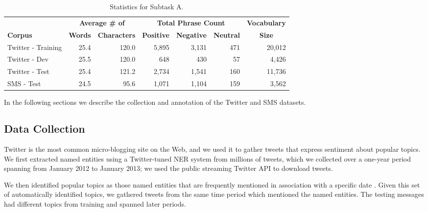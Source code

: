 
 \begin{table}[t]
\small
\begin{center}
\begin{tabular}{|l|r|r|r|r|r|r|}
\hline
 & \multicolumn{2}{c|}{\bf Average \# of} & \multicolumn{3}{c|}{\bf Total Phrase Count} & \bf Vocabulary \\
\bf Corpus & \bf Words & \bf Characters & \bf Positive & \bf Negative & \bf Neutral & \multicolumn{1}{c|}{\bf Size}\\
\hline
Twitter - Training &25.4  &        120.0        &       5,895  &  3,131 &  471 &  20,012     \\
Twitter - Dev & 25.5 & 120.0 & 648 & 430 & 57 & 4,426 \\
Twitter - Test  & 25.4 & 121.2 & 2,734 & 1,541 & 160 & 11,736 \\
SMS - Test & 24.5 & 95.6 & 1,071 & 1,104 & 159 & 3,562 \\
\hline
\end{tabular}
\caption{Statistics for Subtask A.}
\label{T:CorpusStatsA}
\end{center}
\end{table}

In the following sections we describe the collection and annotation of the Twitter and SMS datasets.

 \subsection{Data Collection}

Twitter is the most common micro-blogging site on the Web,
and we used it to gather tweets that express sentiment about popular topics.
We first extracted named entities using a Twitter-tuned NER system \cite{ner}
from millions of tweets, which we collected over a one-year period spanning from January 2012 to January 2013;
we used the public streaming Twitter API to download tweets.

We then identified popular topics as those named entities that are frequently mentioned in association with a specific date \cite{ritter12}.
Given this set of automatically identified topics, we gathered tweets from the same time period which mentioned the named entities.
The testing messages had different topics from training and spanned later periods.

